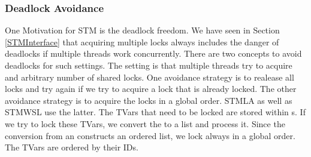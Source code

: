 \subsubsection{Deadlock Avoidance}
One Motivation for STM is the deadlock freedom. We have seen in Section \ref{STMInterface} that acquiring 
multiple locks always includes the danger of deadlocks if multiple threads work concurrently. 
There are two concepts to avoid deadlocks for such settings. The setting is that multiple threads
try to acquire and arbitrary number of shared locks. One avoidance strategy is to realease all locks
and try again if we try to acquire a lock that is already locked. The other avoidance strategy is to 
acquire the locks in a global order. STMLA as well as STMWSL use the latter. The TVars that need to be 
locked are stored within s. If we try to lock these TVars, we convert the  to a
list and process it. Since the conversion from an  constructs an ordered list, we lock always 
in a global order. The TVars are ordered by their IDs.


